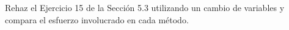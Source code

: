 Rehaz el Ejercicio 15 de la Sección 5.3 utilizando un cambio de variables y compara el esfuerzo involucrado en cada método.
